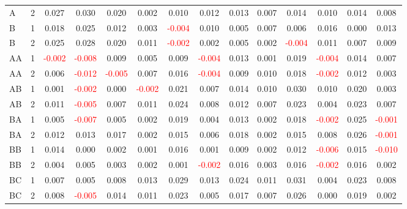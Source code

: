 \begin{table}[H]
{\begin{tabular}{llcccccccccccc}
A & 2 & 0.027 & 0.030 & 0.020 & 0.002 & 0.010 & 0.012 & 0.013 & 0.007 & 0.014 & 0.010 & 0.014 & 0.008\\
B & 1 & 0.018 & 0.025 & 0.012 & 0.003 & \textcolor{red}{-0.004} & 0.010 & 0.005 & 0.007 & 0.006 & 0.016 & 0.000 & 0.013\\
B & 2 & 0.025 & 0.028 & 0.020 & 0.011 & \textcolor{red}{-0.002} & 0.002 & 0.005 & 0.002 & \textcolor{red}{-0.004} & 0.011 & 0.007 & 0.009\\
AA & 1 & \textcolor{red}{-0.002} & \textcolor{red}{-0.008} & 0.009 & 0.005 & 0.009 & \textcolor{red}{-0.004} & 0.013 & 0.001 & 0.019 & \textcolor{red}{-0.004} & 0.014 & 0.007\\
AA & 2 & 0.006 & \textcolor{red}{-0.012} & \textcolor{red}{-0.005} & 0.007 & 0.016 & \textcolor{red}{-0.004} & 0.009 & 0.010 & 0.018 & \textcolor{red}{-0.002} & 0.012 & 0.003\\
AB & 1 & 0.001 & \textcolor{red}{-0.002} & 0.000 & \textcolor{red}{-0.002} & 0.021 & 0.007 & 0.014 & 0.010 & 0.030 & 0.010 & 0.020 & 0.003\\
AB & 2 & 0.011 & \textcolor{red}{-0.005} & 0.007 & 0.011 & 0.024 & 0.008 & 0.012 & 0.007 & 0.023 & 0.004 & 0.023 & 0.007\\
BA & 1 & 0.005 & \textcolor{red}{-0.007} & 0.005 & 0.002 & 0.019 & 0.004 & 0.013 & 0.002 & 0.018 & \textcolor{red}{-0.002} & 0.025 & \textcolor{red}{-0.001}\\
BA & 2 & 0.012 & 0.013 & 0.017 & 0.002 & 0.015 & 0.006 & 0.018 & 0.002 & 0.015 & 0.008 & 0.026 & \textcolor{red}{-0.001}\\
BB & 1 & 0.014 & 0.000 & 0.002 & 0.001 & 0.016 & 0.001 & 0.009 & 0.002 & 0.012 & \textcolor{red}{-0.006} & 0.015 & \textcolor{red}{-0.010}\\
BB & 2 & 0.004 & 0.005 & 0.003 & 0.002 & 0.001 & \textcolor{red}{-0.002} & 0.016 & 0.003 & 0.016 & \textcolor{red}{-0.002} & 0.016 & 0.002\\
BC & 1 & 0.007 & 0.005 & 0.008 & 0.013 & 0.029 & 0.013 & 0.024 & 0.011 & 0.031 & 0.004 & 0.023 & 0.008\\
BC & 2 & 0.008 & \textcolor{red}{-0.005} & 0.014 & 0.011 & 0.023 & 0.005 & 0.017 & 0.007 & 0.026 & 0.000 & 0.019 & 0.002\\
\hline
    \end{tabular}%
    }
    \label{tab:cen7_sh}
\end{table}


